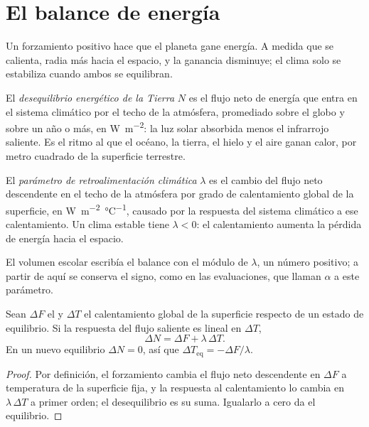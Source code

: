 \section{El balance de energía}\label{sec:b2:anthropogenic-climate-change:energy}

Un forzamiento positivo hace que el planeta gane energía. A medida que se calienta, radia más hacia el espacio, y la
ganancia disminuye; el clima solo se estabiliza cuando ambos se equilibran.

\begin{definition}\label{def:b2:anthropogenic-climate-change:eei}
El \emph{desequilibrio energético de la Tierra} $N$ es el flujo neto de energía que entra en
el sistema climático por el techo de la atmósfera, promediado sobre el globo y sobre un año o más,
en \unit{W.m^{-2}}: la luz solar absorbida menos el infrarrojo saliente. Es el ritmo al que el océano,
la tierra, el hielo y el aire ganan calor, por metro cuadrado de la superficie terrestre.
\end{definition}

\begin{definition}\label{def:b2:anthropogenic-climate-change:lambda}
El \emph{parámetro de retroalimentación climática} $\lambda$ es el cambio del
flujo neto descendente en el techo de la atmósfera por grado de calentamiento global de la superficie, en
\unit{W.m^{-2}.\celsius^{-1}}, causado por la respuesta del sistema climático a ese calentamiento. Un
clima estable tiene $\lambda < 0$: el calentamiento aumenta la pérdida de energía hacia el espacio.
\end{definition}

El volumen escolar escribía el balance con el módulo de $\lambda$, un número positivo; a partir de aquí se
conserva el signo, como en las evaluaciones, que llaman $\alpha$ a este parámetro.

\begin{proposition}\label{prop:b2:anthropogenic-climate-change:balance}
Sean $\Delta F$ el  y $\Delta T$ el calentamiento global de la superficie
respecto de un estado de equilibrio. Si la respuesta del flujo saliente es lineal en $\Delta T$,
\[
  \Delta N = \Delta F + \lambda\,\Delta T .
\]
En un nuevo equilibrio $\Delta N = 0$, así que $\Delta T_{\text{eq}} = -\Delta F/\lambda$.
\end{proposition}
\begin{proof}
Por definición, el forzamiento cambia el flujo neto descendente en $\Delta F$ a temperatura de la superficie
fija, y la respuesta al calentamiento lo cambia en $\lambda\,\Delta T$ a primer orden;
el desequilibrio es su suma. Igualarlo a cero da el equilibrio.
\end{proof}

